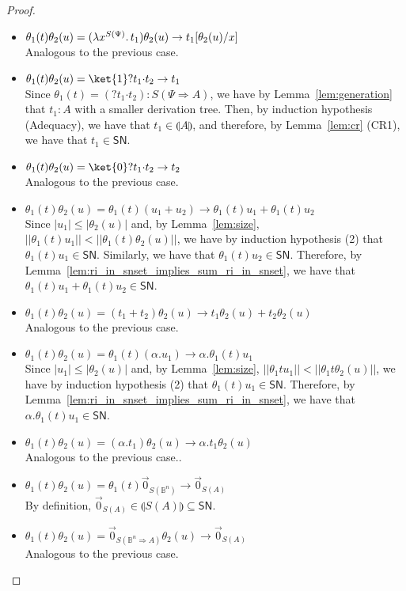 \documentclass[preprint]{elsarticle}
\newcommand\interp[1]{\llparenthesis #1\rrparenthesis}
\newcommand\size[1]{||#1||}
\newcommand\SN{\mathsf{SN}}
\newcommand\lpl[1]{|#1|}
\newcommand\B{\ensuremath{\mathbb B}}
\newcommand\ite[3]{{#1}?{#2}\mathord{\cdot}{#3}}
\newcommand\z[1][A]{\vec 0_{S(#1)}}
\newcommand\nullvec[1]{\z[#1]}
\newcommand{\app}[2]{#1 #2}
\newcommand{\reducesto}{\rightarrow}
\newcommand{\vrbl}[2]{#1^{#2}}
\newcommand{\abstr}[2]{\lambda#1\ldotp#2}
\begin{document}
\begin{proof}
\begin{itemize}
\begin{itemize}
    \item \( \app{\theta_1(t)}{\theta_2(u)} = \app{(\abstr{\vrbl{x}{S(\Psi)}}{t_1})}{\theta_2(u)} \reducesto t_1[\theta_2(u)/x] \)
      \\ Analogous to the previous case.
    \item \( \app{\theta_1(t)}{\theta_2(u)} = \ite{\ket{1}}{t_1}{t_2} \reducesto t_1 \)
      \\ Since \( \theta_1(t) = (\ite{}{t_1}{t_2}) : S(\Psi \Rightarrow A) \), we have by Lemma~\ref{lem:generation}  that \( t_1 : A \) with a smaller derivation tree. Then, by induction hypothesis (Adequacy), we have that \( t_1 \in \interp{A} \), and therefore, by Lemma~\ref{lem:cr} (CR1), we have that \( t_1 \in \SN \).
    \item \( \app{\theta_1(t)}{\theta_2(u)} = \ite{\ket{0}}{t_1}{t_2} \reducesto t_2 \)
      \\ Analogous to the previous case.
    \item \( \app{\theta_1(t)}{\theta_2(u)} = \app{\theta_1(t)}{(u_1 + u_2)} \reducesto \app{\theta_1(t)}{u_1} + \app{\theta_1(t)}{u_2} \)
      \\ Since \( \lpl{u_1} \leq \lpl{\theta_2(u)} \) and, by Lemma~\ref{lem:size}, \( \size{\app{\theta_1(t)}{u_1}} < \size{\app{\theta_1(t)}{\theta_2(u)}} \), we have by induction hypothesis (2) that \( \app{\theta_1(t)}{u_1} \in \SN \). Similarly, we have that \( \app{\theta_1(t)}{u_2} \in \SN \). Therefore, by Lemma~\ref{lem:ri_in_snset_implies_sum_ri_in_snset}, we have that \( \app{\theta_1(t)}{u_1} + \app{\theta_1(t)}{u_2} \in \SN \).
    \item \( \app{\theta_1(t)}{\theta_2(u)} = \app{(t_1 + t_2)}{\theta_2(u)} \reducesto \app{t_1}{\theta_2(u)} + \app{t_2}{\theta_2(u)} \)
      \\ Analogous to the previous case.
    \item \( \app{\theta_1(t)}{\theta_2(u)} = \app{\theta_1(t)}{(\alpha . u_1)} \reducesto \alpha . \app{\theta_1(t)}{u_1} \)
      \\ Since \( \lpl{u_1} \leq \lpl{\theta_2(u)} \) and, by Lemma~\ref{lem:size}, \( \size{\app{\theta_1{t}}{u_1}} < \size{\app{\theta_1{t}}{\theta_2(u)}} \), we have by induction hypothesis (2) that \( \app{\theta_1(t)}{u_1} \in \SN \). Therefore, by Lemma~\ref{lem:ri_in_snset_implies_sum_ri_in_snset}, we have that \( \alpha . \app{\theta_1(t)}{u_1} \in \SN \).
    \item \( \app{\theta_1(t)}{\theta_2(u)} = \app{(\alpha . t_1)}{\theta_2(u)} \reducesto \alpha . \app{t_1}{\theta_2(u)} \)
      \\ Analogous to the previous case..
    \item \( \app{\theta_1(t)}{\theta_2(u)} = \app{\theta_1(t)}{\nullvec{\B^n}} \reducesto \nullvec{A} \)
      \\ By definition, \( \nullvec{A} \in \interp{S(A)} \subseteq \SN \).
    \item \( \app{\theta_1(t)}{\theta_2(u)} = \app{\nullvec{\B^n \Rightarrow A}}{\theta_2(u)} \reducesto \nullvec{A} \)
      \\ Analogous to the previous case.
    \end{itemize}



\end{itemize}
\end{proof}
\end{document}
